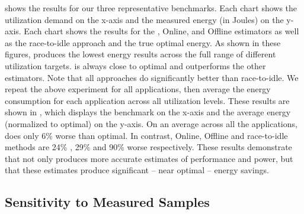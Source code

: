  shows the results for our three representative
benchmarks.  Each chart shows the utilization demand on the x-axis and
the measured energy (in Joules) on the y-axis.  Each chart shows the
results for the \SYSTEMLEO{}, Online, and Offline estimators as well as
the race-to-idle approach and the true optimal energy.  As shown in
these figures, \SYSTEMLEO{} produces the lowest energy results across the
full range of different utilization targets.  \SYSTEMLEO{} is always
close to optimal and outperforms the other estimators.  Note that all
approaches do significantly better than race-to-idle. We repeat the
above experiment for all applications, then average the energy
consumption for each application across all utilization levels.  These
results are shown in , which displays the
benchmark on the x-axis and the average energy (normalized to optimal)
on the y-axis.  On an average across all the applications, \SYSTEMLEO{}
does only 6\% worse than optimal.  In contrast, Online, Offline and
race-to-idle methods are 24\% , 29\% and 90\% worse respectively.
These results demonstrate that \SYSTEMLEO{} not only produces more
accurate estimates of performance and power, but that these estimates
produce significant -- near optimal -- energy savings.

\subsection{Sensitivity to Measured Samples}

